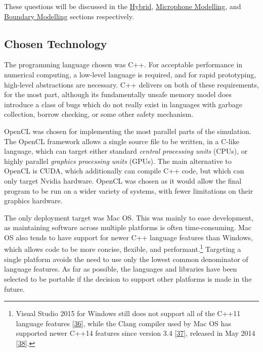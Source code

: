 \documentclass[]{scrreprt}
\begin{document}
These questions will be discussed in the
\href{\%7B\%7B\%20site.baseurl\%20\%7D\%7D\%7B\%\%20link\%20hybrid.md\%20\%\%7D}{Hybrid},
\href{\%7B\%7B\%20site.baseurl\%20\%7D\%7D\%7B\%\%20link\%20microphone.md\%20\%\%7D}{Microphone
Modelling}, and
\href{\%7B\%7B\%20site.baseurl\%20\%7D\%7D\%7B\%\%20link\%20boundary.md\%20\%\%7D}{Boundary
Modelling} sections respectively.

\subsection{Chosen Technology}\label{chosen-technology}

The programming language chosen was C++. For acceptable performance in
numerical computing, a low-level language is required, and for rapid
prototyping, high-level abstractions are necessary. C++ delivers on both
of these requirements, for the most part, although its fundamentally
unsafe memory model does introduce a class of bugs which do not really
exist in languages with garbage collection, borrow checking, or some
other safety mechanism.

OpenCL was chosen for implementing the most parallel parts of the
simulation. The OpenCL framework allows a single source file to be
written, in a C-like language, which can target either standard
\emph{central processing units} (CPUs), or highly parallel
\emph{graphics processing units} (GPUs). The main alternative to OpenCL
is CUDA, which additionally can compile C++ code, but which can only
target Nvidia hardware. OpenCL was chosen as it would allow the final
program to be run on a wider variety of systems, with fewer limitations
on their graphics hardware.

The only deployment target was Mac OS. This was mainly to ease
development, as maintaining software across multiple platforms is often
time-consuming. Mac OS also tends to have support for newer C++ language
features than Windows, which allows code to be more concise, flexible,
and performant.\footnote{Visual Studio 2015 for Windows still does not
  support all of the C++11 language features
  {[}\protect\hyperlink{ref-ux5fvisualux5f2016}{36}{]}, while the Clang
  compiler used by Mac OS has supported newer C++14 features since
  version 3.4 {[}\protect\hyperlink{ref-ux5fclangux5f2016}{37}{]},
  released in May 2014
  {[}\protect\hyperlink{ref-ux5fdownloadux5f2016}{38}{]}.} Targeting a
single platform avoids the need to use only the lowest common
denominator of language features. As far as possible, the languages and
libraries have been selected to be portable if the decision to support
other platforms is made in the future.
\end{document}
